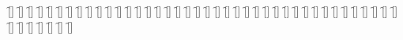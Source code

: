 \begin{questions}
\begin{multicols}{2}
        \question  \f[]
        \question  \f[]
        \question  \f[]
        \question  \f[]
        \question  \f[]
        \question  \f[]
        \question  \f[]
        \question  \f[]
        \question  \f[]
        \question  \f[]
        \question  \f[]
        \question  \f[]
        \question  \f[]
        \question  \f[]
        \question  \f[]
        \question  \f[]
        \question  \f[]
        \question  \f[]
        \question  \f[]
        \question  \f[]
        \question  \f[]
        \question  \f[]
        \question  \f[]
        \question  \f[]
        \question  \f[]
        \question  \f[]
        \question  \f[]
        \question  \f[]
        \question  \f[]
        \question  \f[]
        \question  \f[]
        \question  \f[]
        \question  \f[]
        \question  \f[]
        \question  \f[]
        \question  \f[]
        \question  \f[]
        \question  \f[]
        \question  \f[]
        \question  \f[]
        \question  \f[]
        \question  \f[]
        \question  \f[]
        \question  \f[]
        \question  \f[]
        \question  \f[]
        \question  \f[]
    \end{multicols}
\end{questions}
